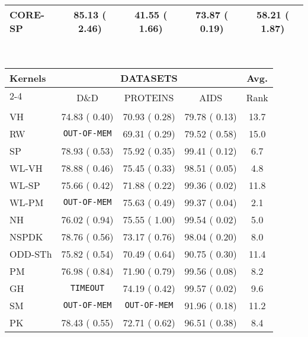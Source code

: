 \documentclass[twoside,11pt]{article}
\begin{document}
\begin{table}[t]
\begin{sc}
\begin{tabular}{lcccc}
CORE-SP & 85.13 {\tiny ( 2.46)} & 41.55 {\tiny ( 1.66)} & 73.87 {\tiny ( 0.19)} & 58.21 {\tiny ( 1.87)} \\ \hline
\end{tabular}
\vspace{.2cm}
\\
\begin{tabular}{lccc m{1.7cm}} \hline
\multirow{3}{*}{Kernels} & \multicolumn{3}{c}{DATASETS} & \multicolumn{1}{c}{\multirow{2}{*}{Avg.}} \\ \cline{2-4}
& \multirow{2}{*}{D\&D} & \multirow{2}{*}{PROTEINS} & \multirow{2}{*}{AIDS} & \multicolumn{1}{c}{\multirow{2}{*}{Rank}} \\ 
& & & & \\ \hline
VH & 74.83 {\tiny ( 0.40)} & 70.93 {\tiny ( 0.28)} & 79.78 {\tiny ( 0.13)} & \multicolumn{1}{c}{13.7} \\
RW & \texttt{OUT-OF-MEM} & 69.31 {\tiny ( 0.29)} & 79.52 {\tiny ( 0.58)} & \multicolumn{1}{c}{15.0} \\
SP & 78.93 {\tiny ( 0.53)} & 75.92 {\tiny ( 0.35)} & 99.41 {\tiny ( 0.12)} & \multicolumn{1}{c}{6.7} \\
WL-VH & 78.88 {\tiny ( 0.46)} & 75.45 {\tiny ( 0.33)} & 98.51 {\tiny ( 0.05)} & \multicolumn{1}{c}{4.8} \\
WL-SP & 75.66 {\tiny ( 0.42)} & 71.88 {\tiny ( 0.22)} & 99.36 {\tiny ( 0.02)} & \multicolumn{1}{c}{11.8} \\
WL-PM & \texttt{OUT-OF-MEM} & 75.63 {\tiny ( 0.49)} & 99.37 {\tiny ( 0.04)} & \multicolumn{1}{c}{2.1} \\
NH & 76.02 {\tiny ( 0.94)} & 75.55 {\tiny ( 1.00)} & 99.54 {\tiny ( 0.02)} & \multicolumn{1}{c}{5.0} \\
NSPDK & 78.76 {\tiny ( 0.56)} & 73.17 {\tiny ( 0.76)} & 98.04 {\tiny ( 0.20)} & \multicolumn{1}{c}{8.0} \\
ODD-STh & 75.82 {\tiny ( 0.54)} & 70.49 {\tiny ( 0.64)} & 90.75 {\tiny ( 0.30)} & \multicolumn{1}{c}{11.4} \\
PM & 76.98 {\tiny ( 0.84)} & 71.90 {\tiny ( 0.79)} & 99.56 {\tiny ( 0.08)} & \multicolumn{1}{c}{8.2} \\
GH & \texttt{TIMEOUT} & 74.19 {\tiny ( 0.42)} & 99.57 {\tiny ( 0.02)} & \multicolumn{1}{c}{9.6} \\
SM & \texttt{OUT-OF-MEM} & \texttt{OUT-OF-MEM} & 91.96 {\tiny ( 0.18)} & \multicolumn{1}{c}{11.2} \\
PK & 78.43 {\tiny ( 0.55)} & 72.71 {\tiny ( 0.62)} & 96.51 {\tiny ( 0.38)} & \multicolumn{1}{c}{8.4} \\

\end{tabular}
\end{sc}
\end{table}
\end{document}

